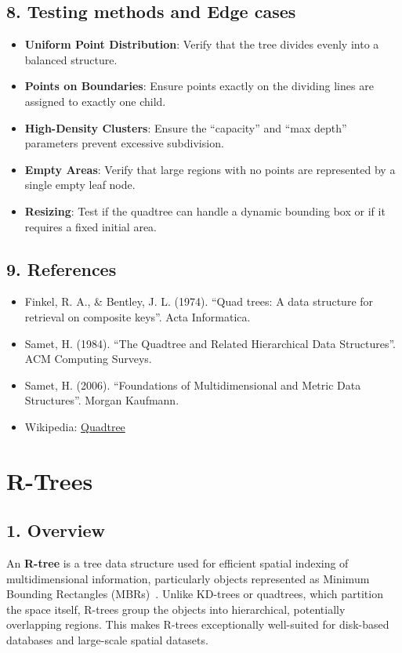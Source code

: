 \subsection{8. Testing methods and Edge cases}
\begin{itemize}
    \item \textbf{Uniform Point Distribution}: Verify that the tree divides evenly into a balanced structure.
    \item \textbf{Points on Boundaries}: Ensure points exactly on the dividing lines are assigned to exactly one child.
    \item \textbf{High-Density Clusters}: Ensure the ``capacity'' and ``max depth'' parameters prevent excessive subdivision.
    \item \textbf{Empty Areas}: Verify that large regions with no points are represented by a single empty leaf node.
    \item \textbf{Resizing}: Test if the quadtree can handle a dynamic bounding box or if it requires a fixed initial area.
\end{itemize}

\subsection{9. References}
\begin{itemize}
    \item Finkel, R. A., \& Bentley, J. L. (1974). ``Quad trees: A data structure for retrieval on composite keys''. Acta Informatica.
    \item Samet, H. (1984). ``The Quadtree and Related Hierarchical Data Structures''. ACM Computing Surveys.
    \item Samet, H. (2006). ``Foundations of Multidimensional and Metric Data Structures''. Morgan Kaufmann.
    \item Wikipedia: \href{https://en.wikipedia.org/wiki/Quadtree}{Quadtree}
\end{itemize}

\section{R-Trees}
\label{sec:r_tree}

\subsection{1. Overview}
An \textbf{R-tree} is a tree data structure used for efficient spatial indexing of multidimensional information, particularly objects represented as Minimum Bounding Rectangles (MBRs)~\cite{guttman1984}. Unlike KD-trees or quadtrees, which partition the space itself, R-trees group the objects into hierarchical, potentially overlapping regions. This makes R-trees exceptionally well-suited for disk-based databases and large-scale spatial datasets.

